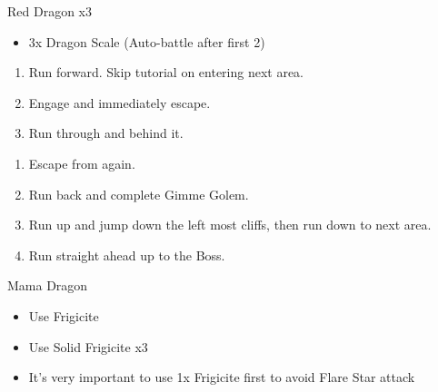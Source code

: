 \begin{battle}[]{Red Dragon x3}
	\begin{itemize}
		\item 3x Dragon Scale (Auto-battle after first 2)
	\end{itemize}
\end{battle}
\begin{enumerate}[resume]
	\item Run forward. Skip tutorial on entering next area.
	\item Engage  and immediately escape.
	\item Run through  and  behind it.
\end{enumerate}
\begin{enumerate}[resume]
	\item Escape from  again.
	\item Run back and complete Gimme Golem.
	\item Run up and jump down the left most cliffs, then run down to next area.
	\item Run straight ahead up to the Boss.
\end{enumerate}
\begin{battle}[]{Mama Dragon}
	\begin{itemize}
		\item Use Frigicite
		\item Use Solid Frigicite x3
		\item It's very important to use 1x Frigicite first to avoid Flare Star attack
	\end{itemize}
\end{battle}